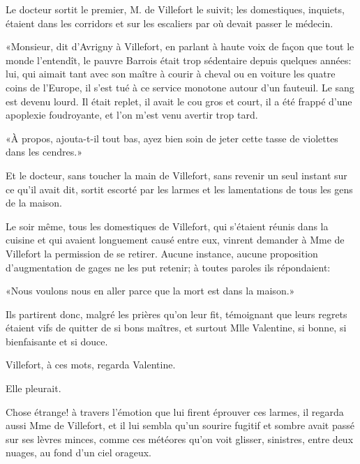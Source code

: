 Le docteur sortit le premier, M. de Villefort le suivit; les domestiques, inquiets, étaient dans les corridors et sur les escaliers par où devait passer le médecin. 

«Monsieur, dit d'Avrigny à Villefort, en parlant à haute voix de façon que tout le monde l'entendît, le pauvre Barrois était trop sédentaire depuis quelques années: lui, qui aimait tant avec son maître à courir à cheval ou en voiture les quatre coins de l'Europe, il s'est tué à ce service monotone autour d'un fauteuil. Le sang est devenu lourd. Il était replet, il avait le cou gros et court, il a été frappé d'une apoplexie foudroyante, et l'on m'est venu avertir trop tard. 

«À propos, ajouta-t-il tout bas, ayez bien soin de jeter cette tasse de violettes dans les cendres.» 

Et le docteur, sans toucher la main de Villefort, sans revenir un seul instant sur ce qu'il avait dit, sortit escorté par les larmes et les lamentations de tous les gens de la maison. 

Le soir même, tous les domestiques de Villefort, qui s'étaient réunis dans la cuisine et qui avaient longuement causé entre eux, vinrent demander à Mme de Villefort la permission de se retirer. Aucune instance, aucune proposition d'augmentation de gages ne les put retenir; à toutes paroles ils répondaient: 

«Nous voulons nous en aller parce que la mort est dans la maison.» 

Ils partirent donc, malgré les prières qu'on leur fit, témoignant que leurs regrets étaient vifs de quitter de si bons maîtres, et surtout Mlle Valentine, si bonne, si bienfaisante et si douce. 

Villefort, à ces mots, regarda Valentine. 

Elle pleurait. 

Chose étrange! à travers l'émotion que lui firent éprouver ces larmes, il regarda aussi Mme de Villefort, et il lui sembla qu'un sourire fugitif et sombre avait passé sur ses lèvres minces, comme ces météores qu'on voit glisser, sinistres, entre deux nuages, au fond d'un ciel orageux. 